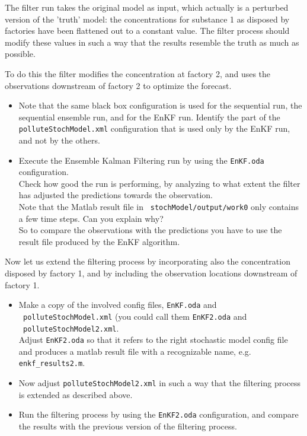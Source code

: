\documentclass[a4paper,10pt]{article}
\begin{document}
The filter run takes the original model as input, which actually is a perturbed
version of the 'truth' model: the concentrations for substance 1 as disposed by
factories have been flattened out to a constant value. The filter process
should modify these values in such a way that the results resemble the truth as
much as possible.

To do this the filter modifies the concentration at factory 2, and uses the
observations downstream of factory 2 to optimize the forecast.

\begin{itemize}
 \item Note that the same black box configuration is used for the sequential
   run, the sequential ensemble run, and for the EnKF run. Identify the part of
   the {\tt polluteStochModel.xml} configuration that is used only by the EnKF
   run, and not by the others.
 \item Execute the Ensemble Kalman Filtering run by using the {\tt EnKF.oda}
   configuration.\\ Check how good the run is performing, by analyzing to what
   extent the filter has adjusted the predictions towards the
   observation.\\ Note that the Matlab result file in {\tt
     stochModel/output/work0} only contains a few time steps. Can you explain
   why?\\ So to compare the observations with the predictions you have to use
   the result file produced by the EnKF algorithm.
\end{itemize}

Now let us extend the filtering process by incorporating also the concentration
disposed by factory 1, and by including the observation locations downstream of
factory 1.

\begin{itemize}
 \item Make a copy of the involved config files, {\tt EnKF.oda} and \\{\tt
   polluteStochModel.xml} (you could call them {\tt EnKF2.oda} and\\ {\tt
   polluteStochModel2.xml}.\\ Adjust {\tt EnKF2.oda} so that it refers to the
   right stochastic model config file and produces a matlab result file with a
   recognizable name, e.g. {\tt enkf\_results2.m}.
 \item Now adjust {\tt polluteStochModel2.xml} in such a way that the filtering
   process is extended as described above.
 \item Run the filtering process by using the {\tt EnKF2.oda} configuration,
   and compare the results with the previous version of the filtering process.
\end{itemize}
\end{document}
